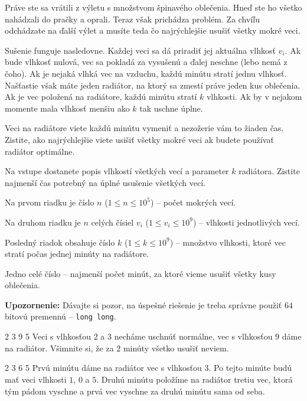 




Práve ste sa vrátili z výletu s množstvom špinavého oblečenia. Hneď ste ho všetko nahádzali do
pračky a oprali. Teraz však prichádza problém. Za chvíľu odchádzate na ďalší výlet a musíte teda čo
najrýchlejšie usušiť všetky mokré veci.

Sušenie funguje nasledovne. Každej veci sa dá priradiť jej aktuálna vlhkosť $v_i$. Ak bude vlhkosť
nulová, vec sa pokladá za vysušenú a ďalej neschne (lebo nemá z čoho). Ak je nejaká vlhká vec
na vzduchu, každú minútu stratí jednu vlhkosť. Našťastie však máte jeden radiátor, na ktorý sa
zmestí práve jeden kus oblečenia. Ak je vec položená na radiátore, každú minútu stratí $k$ vlhkosti.
Ak by v nejakom momente mala vlhkosť menšiu ako $k$ tak uschne úplne.

Veci na radiátore viete každú minútu vymeniť a nezožerie vám to žiaden čas. Zistite, ako
najrýchlejšie viete usišiť všetky mokré veci ak budete používať radiátor optimálne.


Na vstupe dostanete popis vlhkostí všetkých vecí a parameter $k$ radiátora. Zistite najmenší čas
potrebný na úplné usušenie všetkých vecí.


Na prvom riadku je číslo $n$ ($1 \leq n \leq 10^5$) -- počet mokrých vecí.

Na druhom riadku je $n$ celých čísiel $v_i$ ($1 \leq v_i \leq 10^9$) -- vlhkosti jednotlivých vecí.

Posledný riadok obsahuje číslo $k$ ($1 \leq k \leq 10^9$) -- množstvo vlhkosti, ktoré vec stratí
počas jednej minúty na radiátore.


Jedno celé číslo -- najmenší počet minút, za ktoré vieme usušiť všetky kusy oblečenia.

\medskip

\textbf{Upozornenie:} Dávajte si pozor, na úspešné riešenie je treba správne použiť $64$ bitovú
premennú -- \texttt{long long}.


2 3 9
5
\komentar
Veci s vlhkosťou $2$ a $3$ necháme uschnúť normálne, vec s vlhkosťou $9$ dáme na radiátor. Všimnite
si, že za $2$ minúty všetko usušiť neviem.
\koniec

2 3 6
5
\komentar
Prvú minútu dáme na radiátor vec s vlhkosťou $3$. Po tejto minúte budú mať veci vlhkosti $1$, $0$ a
$5$. Druhú minútu položíme na radiátor tretiu vec, ktorá tým pádom vyschne a prvá vec vyschne za
druhú minútu sama od seba.
\koniec


